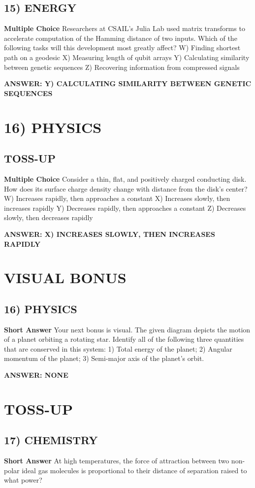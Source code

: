 \documentclass{article}
\begin{document}
\subsection*{15) ENERGY}
\textbf{Multiple Choice} Researchers at CSAIL's Julia Lab used matrix transforms to accelerate computation of the Hamming distance of two inputs.
Which of the following tasks will this development most greatly affect?
W) Finding shortest path on a geodesic
X) Measuring length of qubit arrays
Y) Calculating similarity between genetic sequences
Z) Recovering information from compressed signals

\textbf{ANSWER: Y) CALCULATING SIMILARITY BETWEEN GENETIC SEQUENCES}

\section*{16) PHYSICS}
\subsection*{TOSS-UP}
\textbf{Multiple Choice} Consider a thin, flat, and positively charged conducting disk.
How does its surface charge density change with distance from the disk's center?
W) Increases rapidly, then approaches a constant
X) Increases slowly, then increases rapidly
Y) Decreases rapidly, then approaches a constant
Z) Decreases slowly, then decreases rapidly

\textbf{ANSWER: X) INCREASES SLOWLY, THEN INCREASES RAPIDLY}

\section*{VISUAL BONUS}
\subsection*{16) PHYSICS}
\textbf{Short Answer} Your next bonus is visual. The given diagram depicts the motion of a planet orbiting a rotating star.
Identify all of the following three quantities that are conserved in this system: 1) Total energy of the planet; 2) Angular momentum of the planet; 3) Semi-major axis of the planet's orbit.

\textbf{ANSWER: NONE}

\section*{TOSS-UP}
\subsection*{17) CHEMISTRY}
\textbf{Short Answer} At high temperatures, the force of attraction between two non-polar ideal gas molecules is proportional to their distance of separation raised to what power?
\end{document}
